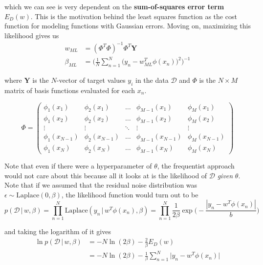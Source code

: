 \documentclass{article}
\begin{document}
    which we can see is very dependent on the \textbf{sum-of-squares error term} $E_D(w)$. This is the motivation behind the least squares function as the cost function for modeling functions with Gaussian errors. Moving on, maximizing this likelihood gives us
    \begin{align*}
      w_{ML} & = (\Phi^T \Phi)^{-1} \Phi^T \mathbf{Y} \\
      \beta_{ML} & = \Bigg( \frac{1}{N} \sum_{n=1}^N \big( y_n - w_{ML}^T \phi(x_n)\big)^2 \Bigg)^{-1}
    \end{align*}

    where $\mathbf{Y}$ is the $N$-vector of target values $y_i$ in the data $\mathcal{D}$ and $\Phi$ is the $N \times M$ matrix of basis functions evaluated for each $x_n$.

    \begin{equation}
      \Phi = \begin{pmatrix}
        \phi_1 (x_1) & \phi_2 (x_1) & \ldots & \phi_{M-1} (x_1) & \phi_M (x_1) \\
        \phi_1 (x_2) & \phi_2 (x_2) & \ldots & \phi_{M-1} (x_2) & \phi_M (x_2) \\
        \vdots & \vdots & \ddots & \vdots & \vdots \\
        \phi_1 (x_{N-1}) & \phi_2 (x_{N-1}) & \ldots & \phi_{M-1} (x_{N-1}) & \phi_M (x_{N-1}) \\
        \phi_1 (x_N) & \phi_2 (x_N) & \ldots & \phi_{M-1} (x_N) & \phi_M (x_N)
      \end{pmatrix}
    \end{equation}

    Note that even if there were a hyperparameter of $\theta$, the frequentist approach would not care about this because all it looks at is the likelihood of $\mathcal{D}$ \textit{given} $\theta$. Note that if we assumed that the residual noise distribution was $\epsilon \sim \text{Laplace}(0, \beta)$, the likelihood function would turn out to be
    \begin{equation}
      p(\mathcal{D}\,|\,w, \beta) = \prod_{n=1}^N \text{Laplace}(y_n\,|\,w^T \phi(x_n), \beta) = \prod_{n=1}^N \frac{1}{2\beta} \exp\bigg(- \frac{|y_n - w^T \phi(x_n)|}{b} \bigg)
    \end{equation}

    and taking the logarithm of it gives
    \begin{align*}
      \ln p( \mathcal{D}\,|\, w, \beta) & = -N \ln{(2\beta)} - \frac{2}{\beta} E_D (w) \\
      & = -N \ln{(2\beta)} - \frac{1}{\beta} \sum_{n=1}^N \big| y_n - w^T \phi(x_n) \big|
    \end{align*}
\end{document}
